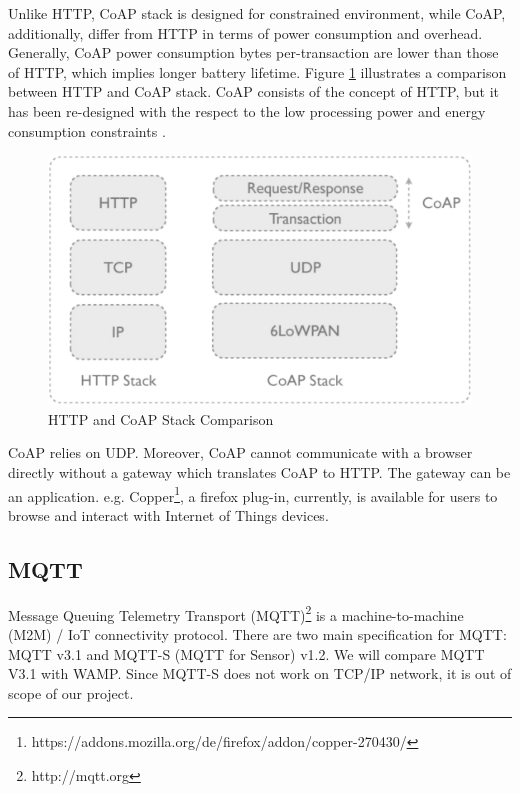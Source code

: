 Unlike HTTP, CoAP stack is designed for constrained environment, while CoAP, additionally, differ from HTTP in terms of power consumption and overhead. Generally, CoAP power consumption bytes per-transaction are lower than those of HTTP, which implies longer battery lifetime. Figure \ref{fig:http-and-coap-stack} illustrates a comparison between HTTP and CoAP stack. CoAP consists of the concept of HTTP, but it has been re-designed with the respect to the low processing power and energy consumption constraints \cite{colitti2011integrating}.

\begin{figure}[ht]
  \begin{center}
    \includegraphics[width=1\textwidth]{images/http-and-coap-stack.pdf}
    \caption{HTTP and CoAP Stack Comparison}
    \label{fig:http-and-coap-stack}
  \end{center}
\end{figure}

CoAP relies on UDP. Moreover, CoAP cannot communicate with a browser directly without a gateway which translates CoAP to HTTP. The gateway can be an application. e.g. Copper\footnote{https://addons.mozilla.org/de/firefox/addon/copper-270430/}, a firefox plug-in, currently, is available for users to browse and interact with Internet of Things devices.

\subsection{MQTT}
Message Queuing Telemetry Transport (MQTT)\footnote{http://mqtt.org} is a machine-to-machine (M2M) / IoT connectivity protocol. There are two main specification for MQTT: MQTT v3.1 and MQTT-S (MQTT for Sensor) v1.2. We will compare MQTT V3.1 with WAMP. Since MQTT-S does not work on TCP/IP network, it is out of scope of our project.

